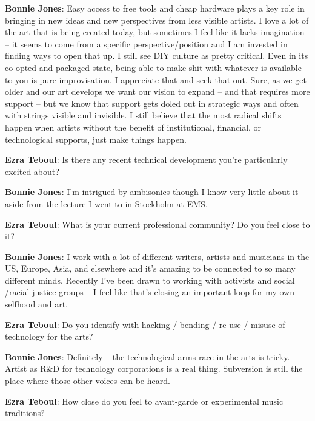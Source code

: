 \textbf{Bonnie Jones}: Easy access to free tools and cheap hardware plays a key role in bringing in new ideas and new perspectives from less visible artists. I love a lot of the art that is being created today, but sometimes I feel like it lacks imagination – it seems to come from a specific perspective/position and I am invested in finding ways to open that up.  
I still see DIY culture as pretty critical. Even in its co-opted and packaged state, being able to make shit with whatever is available to you is pure improvisation. I appreciate that and seek that out. Sure, as we get older and our art develops we want our vision to expand – and that requires more support – but we know that support gets doled out in strategic ways and often with strings visible and invisible. I still believe that the most radical shifts happen when artists without the benefit of institutional, financial, or technological supports, just make things happen.  

\textbf{Ezra Teboul}: Is there any recent technical development you're particularly excited about? 

\textbf{Bonnie Jones}: I’m intrigued by ambisonics though I know very little about it aside from the lecture I went to in Stockholm at EMS. 

\textbf{Ezra Teboul}: What is your current professional community? Do you feel close to it?

\textbf{Bonnie Jones}: I work with a lot of different writers, artists and musicians in the US, Europe, Asia, and elsewhere and it’s amazing to be connected to so many different minds. Recently I’ve been drawn to working with activists and social /racial justice groups – I feel like that’s closing an important loop for my own selfhood and art. 

\textbf{Ezra Teboul}: Do you identify with hacking / bending / re-use / misuse of technology for the arts?

\textbf{Bonnie Jones}: Definitely – the technological arms race in the arts is tricky. Artist as R\&D for technology corporations is a real thing. Subversion is still the place where those other voices can be heard. 

\textbf{Ezra Teboul}: How close do you feel to avant-garde or experimental music traditions?


